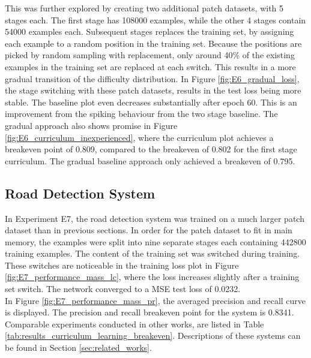 This was further explored by creating two additional patch datasets, with 5 stages each. The first stage has 108000 examples, while the other 4 stages contain 54000 examples each. Subsequent stages replaces the training set, by assigning each example to a random position in the training set. Because the positions are picked by random sampling with replacement, only around 40\% of the existing examples in the training set are replaced at each switch. This results in a more gradual transition of the difficulty distribution. In Figure \ref{fig:E6_gradual_loss}, the stage switching with these patch datasets, results in the test loss being more stable.
The baseline plot even decreases substantially after epoch 60. This is an improvement from the spiking behaviour from the two stage baseline. The gradual approach also shows promise in Figure \ref{fig:E6_curriculum_inexperienced}, where the curriculum plot achieves a breakeven point of 0.809, compared to the breakeven of 0.802 for the first stage curriculum. The gradual baseline approach only achieved a breakeven of 0.795.\\

\subsection{Road Detection System}
\label{sec:results_road_detection_system}
In Experiment E7, the road detection system was trained on a much larger patch dataset than in previous sections. In order for the patch dataset to fit in main memory, the examples were split into nine separate stages each containing 442800 training examples. The content of the training set was switched during training. These switches are noticeable in the training loss plot in Figure \ref{fig:E7_performance_mass_lc}, where the loss increases slightly after a training set switch. The network converged to a \ac{MSE} test loss of 0.0232. \\

In Figure \ref{fig:E7_performance_mass_pr}, the averaged precision and recall curve is displayed. The precision and recall breakeven point for the system is 0.8341. Comparable experiments conducted in other works, are listed in Table \ref{tab:results_curriculum_learning_breakeven}. Descriptions of these systems can be found in Section \ref{sec:related_works}.  \\

